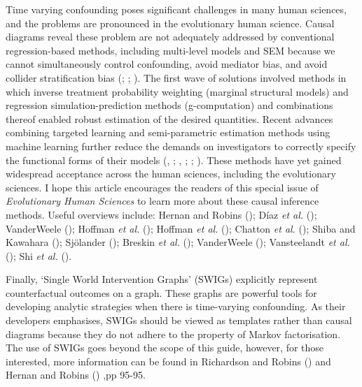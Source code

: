 \documentclass[
  singlecolumn]{article}
\begin{document}
Time varying confounding poses significant challenges in many human
sciences, and the problems are pronounced in the evolutionary human
science. Causal diagrams reveal these problem are not adequately
addressed by conventional regression-based methods, including
multi-level models and SEM because we cannot simultaneously control
confounding, avoid mediator bias, and avoid collider stratification bias
(;
; ). The first wave of solutions involved methods in
which inverse treatment probability weighting (marginal structural
models) and regression simulation-prediction methods (g-computation) and
combinations thereof enabled robust estimation of the desired
quantities. Recent advances combining targeted learning and
semi-parametric estimation methods using machine learning further reduce
the demands on investigators to correctly specify the functional forms
of their models (,
; , ;
;
). These methods have yet
gained widespread acceptance across the human sciences, including the
evolutionary sciences. I hope this article encourages the readers of
this special issue of \emph{Evolutionary Human Sciences} to learn more
about these causal inference methods. Useful overviews include: Hernan
and Robins (); Díaz \emph{et al.}
(); VanderWeele
(); Hoffman \emph{et al.}
(); Hoffman \emph{et al.}
(); Chatton \emph{et al.}
(); Shiba and Kawahara
(); Sjölander
(); Breskin \emph{et al.}
(); VanderWeele
(); Vansteelandt \emph{et al.}
(); Shi \emph{et al.}
().

Finally, `Single World Intervention Graphs' (SWIGs) explicitly represent
counterfactual outcomes on a graph. These graphs are powerful tools for
developing analytic strategies when there is time-varying confounding.
As their developers emphasises, SWIGs should be viewed as templates
rather than causal diagrams because they do not adhere to the property
of Markov factorisation. The use of SWIGs goes beyond the scope of this
guide, however, for those interested, more information can be found in
Richardson and Robins () and Hernan
and Robins () ,pp 95-95.
\end{document}
